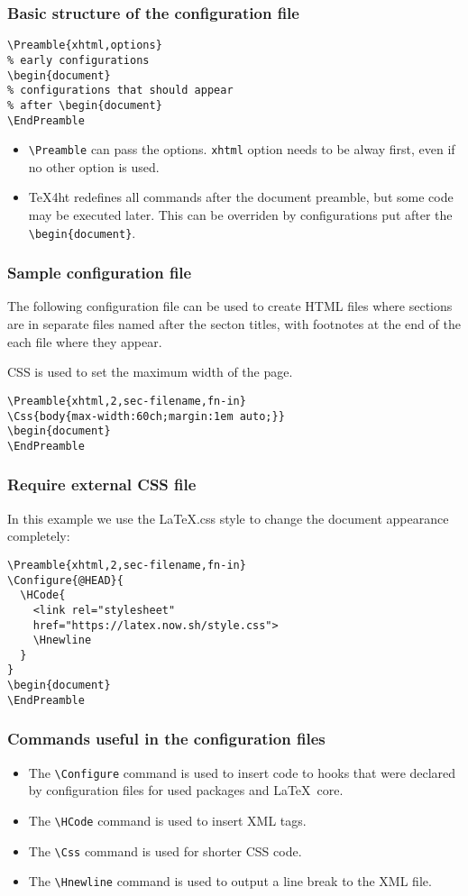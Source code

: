 \documentclass{beamer}
\begin{document}
\begin{frame}[fragile]
  \frametitle{Basic structure of the configuration file}
\begin{verbatim}
\Preamble{xhtml,options}
% early configurations
\begin{document}
% configurations that should appear 
% after \begin{document}
\EndPreamble
\end{verbatim}
\begin{itemize}
  \item \verb|\Preamble| can pass the options. \texttt{xhtml} option needs to be alway first, even if no other option is used.
  \item \TeX4ht redefines all commands after the document preamble, but some code may be executed later. This can be overriden
    by configurations put after the \verb|\begin{document}|.
  \end{itemize}
\end{frame}
\begin{frame}[fragile]
  \frametitle{Sample configuration file}
The following configuration file can be used to create HTML files
where sections are in separate files named after the secton titles,
with footnotes at the end of the each file where they appear.

CSS is used to set the maximum width of the page.

\begin{verbatim}
\Preamble{xhtml,2,sec-filename,fn-in}
\Css{body{max-width:60ch;margin:1em auto;}}
\begin{document}
\EndPreamble
\end{verbatim}
\end{frame}

\begin{frame}[fragile]
  \frametitle{Require external CSS file}
In this example we use the LaTeX.css style to change the document appearance completely:

\begin{verbatim}
\Preamble{xhtml,2,sec-filename,fn-in}
\Configure{@HEAD}{
  \HCode{
    <link rel="stylesheet" 
    href="https://latex.now.sh/style.css">
    \Hnewline
  }
}
\begin{document}
\EndPreamble
\end{verbatim}

\end{frame}


\begin{frame}[fragile]
  \frametitle{Commands useful in the configuration files}
\begin{itemize}
  \item The \verb|\Configure| command is used to insert code to hooks that were declared 
    by configuration files for used packages and \LaTeX\ core.
  \item The \verb|\HCode| command is used to insert XML tags.
  \item The \verb|\Css| command is used for shorter CSS code.
  \item The \verb|\Hnewline| command is used to output a line break to the XML file.
\end{itemize}
\end{frame}
\end{document}
